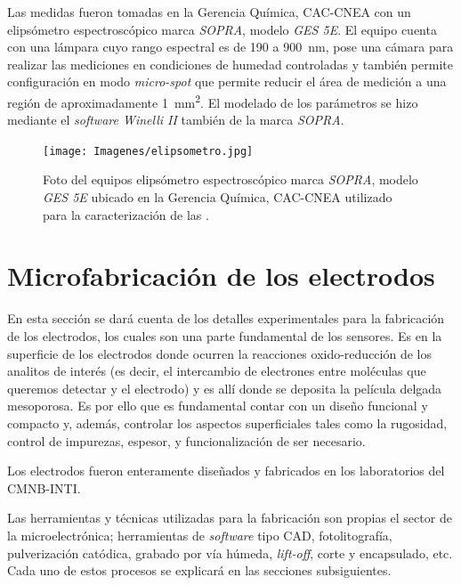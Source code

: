 		Las medidas fueron tomadas en la Gerencia Química, CAC-CNEA con un  elipsómetro espectroscópico marca \textit{SOPRA}, modelo \textit{GES 5E}. El equipo cuenta con una lámpara cuyo rango espectral es de 190 a \SI{900}{\nm}, pose una cámara para realizar las mediciones en condiciones de humedad controladas y también permite configuración en modo \textit{micro-spot} que permite reducir el área de medición a una región de aproximadamente \SI{1}{\mm^2}. El modelado de los parámetros se hizo mediante el \textit{software Winelli II} también de la marca \textit{SOPRA}.
					\begin{figure}[ht]
							  \begin{center}
							  \texttt{[image: Imagenes/elipsometro.jpg]}
							  \caption[Elipsómetro]{Foto del equipos elipsómetro espectroscópico marca \textit{SOPRA}, modelo \textit{GES 5E} ubicado en la Gerencia Química, CAC-CNEA utilizado para la caracterización de las \pdm.}
							  \label{fig:elipsofoto}
							  \end{center}
							  \end{figure}

\section{Microfabricación de los electrodos}
		
	En esta sección se dará cuenta de los detalles experimentales para la fabricación de los electrodos, los cuales son una parte fundamental de los sensores. Es en la superficie de los electrodos donde ocurren la reacciones oxido-reducción de los analitos de interés (es decir, el intercambio de electrones entre moléculas que queremos detectar y el electrodo) y es allí donde se deposita la película delgada mesoporosa. Es por ello que es fundamental contar con un diseño funcional y compacto y, además, controlar los aspectos superficiales tales como la rugosidad, control de impurezas, espesor, y funcionalización de ser necesario. 

	Los electrodos fueron enteramente diseñados y fabricados en los laboratorios del CMNB-INTI. 
		
	Las herramientas y técnicas utilizadas para la fabricación son propias el sector de la microelectrónica; herramientas de \textit{software} tipo CAD, fotolitografía, pulverización catódica, grabado por vía húmeda, \textit{lift-off}, corte y encapsulado, etc.\cite{Franssila2004,Jaeger2001} Cada uno de estos procesos se explicará en las secciones subsiguientes. 

